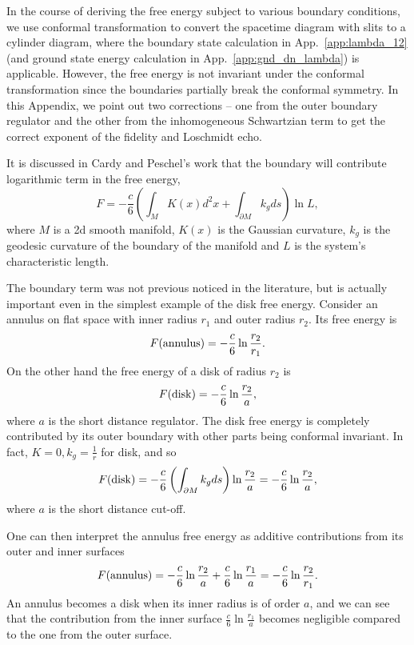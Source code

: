 
In the course of deriving the free energy subject to various boundary conditions, we use conformal transformation to convert the spacetime diagram with slits to a cylinder diagram, where the boundary state calculation in App.~\ref{app:lambda_12} (and ground state energy calculation in App.~\ref{app:gnd_dn_lambda}) is applicable. However, the free energy is not invariant under the conformal transformation since the boundaries partially break the conformal symmetry. In this Appendix, we point out two corrections -- one from the outer boundary regulator and the other from the inhomogeneous Schwartzian term to get the correct exponent of the fidelity and Loschmidt echo. 

It is discussed in Cardy and Peschel's work\cite{cardy_finite-size_1988} that the boundary will contribute logarithmic term in the free energy,
\begin{equation}
F = - \frac{c}{6} \left( \int_M  K(x) d^2x + \int_{\partial M} k_g ds \right)  \ln L , 
\end{equation}
where $M$ is a 2d smooth manifold, $K(x)$ is the Gaussian curvature, $k_g$ is the geodesic curvature of the boundary of the manifold and $L$ is the system's characteristic length. 

The boundary term was not previous noticed in the literature, but is actually important even in the simplest example of the disk free energy. Consider an annulus on flat space with inner radius $r_1$ and outer radius $r_2$. Its free energy is
\begin{equation}
F({\rm annulus}) = -  \frac{c}{6} \ln \frac{r_2}{r_1} .
\end{equation}
On the other hand the free energy of a disk of radius $r_2$ is
\begin{equation}
  F( {\rm disk} ) = - \frac{c}{6} \ln \frac{r_2}{a},
\end{equation}
where $a$ is the short distance regulator. The disk free energy is completely contributed by its outer boundary with other parts being conformal invariant. In fact, $K = 0, k_g = \frac{1}{r}$ for disk, and so 
\begin{equation}
F( {\rm disk}  ) = - \frac{c}{6}  \left( \int_{\partial M} k_g ds \right)  \ln \frac{r_2}{a}  = - \frac{c}{6}  \ln \frac{r_2}{a} , 
\end{equation}
where $a$ is the short distance cut-off. 

One can then interpret the annulus free energy as additive contributions from its outer and inner surfaces
\begin{equation}
F( {\rm annulus} ) = -  \frac{c}{6} \ln \frac{r_2}{a} +  \frac{c}{6} \ln \frac{r_1}{a} = - \frac{c}{6} \ln \frac{r_2}{r_1}.
\end{equation}
An annulus becomes a disk when its inner radius is of order $a$, and we can see that the contribution from the inner surface $\frac{c}{6} \ln \frac{r_1}{a}$ becomes negligible compared to the one from the outer surface.  

